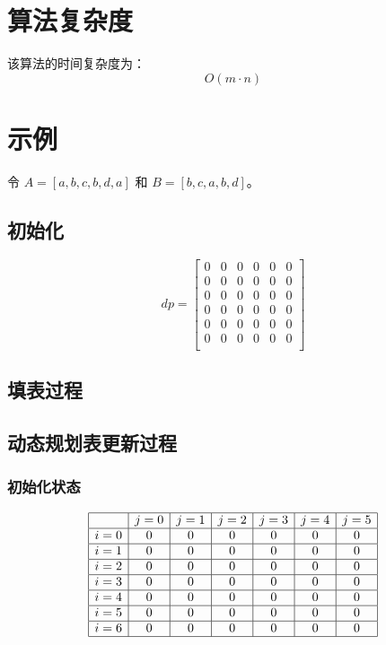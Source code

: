 \documentclass{article}
\begin{document}
\section{算法复杂度}
该算法的时间复杂度为：
\[
O(m \cdot n)
\]

\section{示例}
令 $A = [a, b, c, b, d, a]$ 和 $B = [b, c, a, b, d]$。

\subsection{初始化}
\[
dp =
\begin{bmatrix}
0 & 0 & 0 & 0 & 0 & 0 \\
0 & 0 & 0 & 0 & 0 & 0 \\
0 & 0 & 0 & 0 & 0 & 0 \\
0 & 0 & 0 & 0 & 0 & 0 \\
0 & 0 & 0 & 0 & 0 & 0 \\
0 & 0 & 0 & 0 & 0 & 0 \\
\end{bmatrix}
\]

\subsection{填表过程}
\subsection*{动态规划表更新过程}

\subsubsection*{初始化状态}
\[
\begin{array}{|c|c|c|c|c|c|c|}
\hline
    & j=0 & j=1 & j=2 & j=3 & j=4 & j=5 \\ \hline
i=0 & 0   & 0   & 0   & 0   & 0   & 0   \\ \hline
i=1 & 0   & 0   & 0   & 0   & 0   & 0   \\ \hline
i=2 & 0   & 0   & 0   & 0   & 0   & 0   \\ \hline
i=3 & 0   & 0   & 0   & 0   & 0   & 0   \\ \hline
i=4 & 0   & 0   & 0   & 0   & 0   & 0   \\ \hline
i=5 & 0   & 0   & 0   & 0   & 0   & 0   \\ \hline
i=6 & 0   & 0   & 0   & 0   & 0   & 0   \\ \hline
\end{array}
\]
\end{document}

